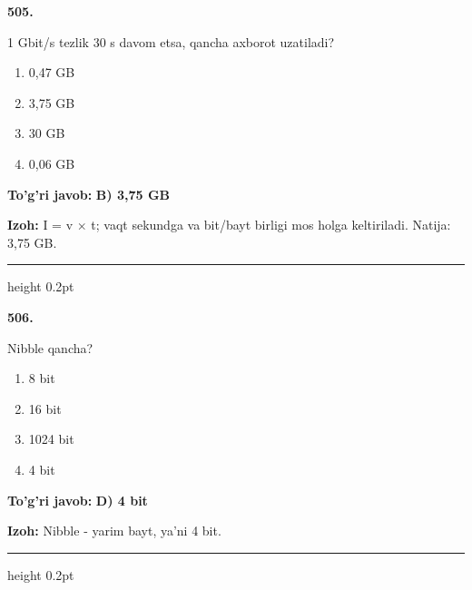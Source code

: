 \documentclass[10pt,a4paper,oneside]{article}
\begin{document}
\noindent\textbf{\color{ink}505.}
\par
1 Gbit/s tezlik 30 s davom etsa, qancha axborot uzatiladi?
\begin{enumerate}[label=\Alph*),leftmargin=9mm]
\item 0,47 GB
\item 3,75 GB
\item 30 GB
\item 0,06 GB
\end{enumerate}
\begin{tcolorbox}[enhanced,breakable,colback=teal!4,colframe=teal!50!black,boxrule=0.5pt,arc=1.1mm,left=3mm,right=3mm,top=1.7mm,bottom=1.7mm,before skip=2mm,after skip=2mm]
\textbf{\color{teal}To'g'ri javob:} \textbf{B) 3,75 GB}
\par\smallskip
\textbf{Izoh:} I = v \ensuremath{\times} t; vaqt sekundga va bit/bayt birligi mos holga keltiriladi. Natija: 3,75 GB.
\end{tcolorbox}
\vspace{2mm}\hrule height 0.2pt \vspace{3mm}

\noindent\textbf{\color{ink}506.}
\par
Nibble qancha?
\begin{enumerate}[label=\Alph*),leftmargin=9mm]
\item 8 bit
\item 16 bit
\item 1024 bit
\item 4 bit
\end{enumerate}
\begin{tcolorbox}[enhanced,breakable,colback=teal!4,colframe=teal!50!black,boxrule=0.5pt,arc=1.1mm,left=3mm,right=3mm,top=1.7mm,bottom=1.7mm,before skip=2mm,after skip=2mm]
\textbf{\color{teal}To'g'ri javob:} \textbf{D) 4 bit}
\par\smallskip
\textbf{Izoh:} Nibble - yarim bayt, ya'ni 4 bit.
\end{tcolorbox}
\vspace{2mm}\hrule height 0.2pt \vspace{3mm}
\end{document}

